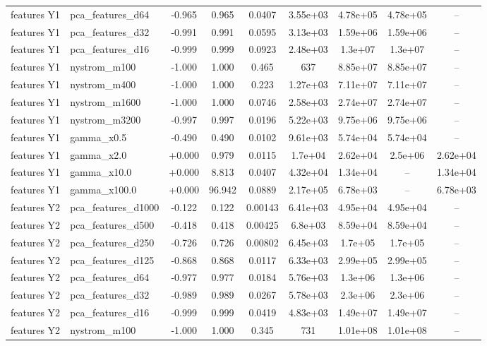 \begin{tabular}{llccccccc}
features Y1 & pca\_features\_d64 & -0.965 & 0.965 & 0.0407 & 3.55e+03 & 4.78e+05 & 4.78e+05 & -- \\
features Y1 & pca\_features\_d32 & -0.991 & 0.991 & 0.0595 & 3.13e+03 & 1.59e+06 & 1.59e+06 & -- \\
features Y1 & pca\_features\_d16 & -0.999 & 0.999 & 0.0923 & 2.48e+03 & 1.3e+07 & 1.3e+07 & -- \\
features Y1 & nystrom\_m100 & -1.000 & 1.000 & 0.465 & 637 & 8.85e+07 & 8.85e+07 & -- \\
features Y1 & nystrom\_m400 & -1.000 & 1.000 & 0.223 & 1.27e+03 & 7.11e+07 & 7.11e+07 & -- \\
features Y1 & nystrom\_m1600 & -1.000 & 1.000 & 0.0746 & 2.58e+03 & 2.74e+07 & 2.74e+07 & -- \\
features Y1 & nystrom\_m3200 & -0.997 & 0.997 & 0.0196 & 5.22e+03 & 9.75e+06 & 9.75e+06 & -- \\
features Y1 & gamma\_x0.5 & -0.490 & 0.490 & 0.0102 & 9.61e+03 & 5.74e+04 & 5.74e+04 & -- \\
features Y1 & gamma\_x2.0 & +0.000 & 0.979 & 0.0115 & 1.7e+04 & 2.62e+04 & 2.5e+06 & 2.62e+04 \\
features Y1 & gamma\_x10.0 & +0.000 & 8.813 & 0.0407 & 4.32e+04 & 1.34e+04 & -- & 1.34e+04 \\
features Y1 & gamma\_x100.0 & +0.000 & 96.942 & 0.0889 & 2.17e+05 & 6.78e+03 & -- & 6.78e+03 \\
features Y2 & pca\_features\_d1000 & -0.122 & 0.122 & 0.00143 & 6.41e+03 & 4.95e+04 & 4.95e+04 & -- \\
features Y2 & pca\_features\_d500 & -0.418 & 0.418 & 0.00425 & 6.8e+03 & 8.59e+04 & 8.59e+04 & -- \\
features Y2 & pca\_features\_d250 & -0.726 & 0.726 & 0.00802 & 6.45e+03 & 1.7e+05 & 1.7e+05 & -- \\
features Y2 & pca\_features\_d125 & -0.868 & 0.868 & 0.0117 & 6.33e+03 & 2.99e+05 & 2.99e+05 & -- \\
features Y2 & pca\_features\_d64 & -0.977 & 0.977 & 0.0184 & 5.76e+03 & 1.3e+06 & 1.3e+06 & -- \\
features Y2 & pca\_features\_d32 & -0.989 & 0.989 & 0.0267 & 5.78e+03 & 2.3e+06 & 2.3e+06 & -- \\
features Y2 & pca\_features\_d16 & -0.999 & 0.999 & 0.0419 & 4.83e+03 & 1.49e+07 & 1.49e+07 & -- \\
features Y2 & nystrom\_m100 & -1.000 & 1.000 & 0.345 & 731 & 1.01e+08 & 1.01e+08 & -- \\

\end{tabular}
